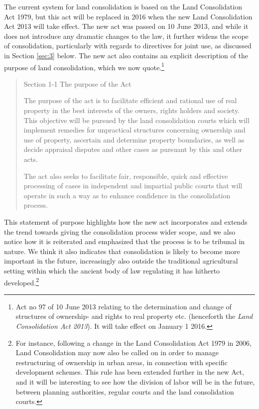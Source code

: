 The current system for land consolidation is based on the Land Consolidation Act 1979, but this act will be replaced in 2016 when the new Land Consolidation Act 2013 will take effect. The new act was passed on 10 June 2013, and while it does not introduce any dramatic changes to the law, it further widens the scope of consolidation, particularly with regards to directives for joint use, as discussed in Section \ref{sec:3} below. The new act also contains an explicit description of the purpose of land consolidation, which we now quote.\footnote{Act no 97 of 10 June 2013 relating to the determination and change of structures of ownership- and rights to real property etc. (henceforth the \emph{Land Consolidation Act 2013}). It will take effect on January 1 2016.}

\begin{quote}
Section 1-1 The purpose of the Act

The purpose of the act is to facilitate efficient and rational use of real property in the best interests of the owners, rights holders and society. This objective will be pursued by the land consolidation courts which will implement remedies for unpractical structures concerning ownership and use of property, ascertain and determine property boundaries, as well as decide appraisal disputes and other cases as pursuant by this and other acts.

The act also seeks to facilitate fair, responsible, quick and effective processing of cases in independent and impartial public courts that will operate in such a way as to enhance confidence in the consolidation process.
\end{quote}

This statement of purpose highlights how the new act incorporates and extends the trend towards giving the consolidation process wider scope, and we also notice how it is reiterated and emphasized that the process is to be tribunal in nature. We think it also indicates that consolidation is likely to become more important in the future, increasingly also outside the traditional agricultural setting within which the ancient body of law regulating it has hitherto developed.\footnote{For instance, following a change in the Land Consolidation Act 1979 in 2006, Land Consolidation may now also be called on in order to manage restructuring of ownership in urban areas, in connection with specific development schemes. This rule has been extended further in the new Act, and it will be interesting to see how the division of labor will be in the future, between planning authorities, regular courts and the land consolidation courts. }

